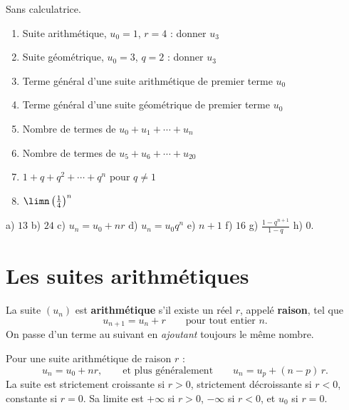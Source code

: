 \begin{automatismes}
Sans calculatrice.

\begin{enumerate}[label=\textbf{\alph*)}, leftmargin=*, itemsep=0.25em]
  \item Suite arithmétique, $u_{0} = 1$, $r = 4$ : donner $u_{3}$
  \item Suite géométrique, $u_{0} = 3$, $q = 2$ : donner $u_{3}$
  \item Terme général d'une suite arithmétique de premier terme $u_{0}$
  \item Terme général d'une suite géométrique de premier terme $u_{0}$
  \item Nombre de termes de $u_{0}+u_{1}+\cdots+u_{n}$
  \item Nombre de termes de $u_{5}+u_{6}+\cdots+u_{20}$
  \item $1+q+q^{2}+\cdots+q^{n}$ pour $q \neq 1$
  \item $\limn \left(\frac{1}{4}\right)^{n}$
\end{enumerate}
\end{automatismes}

\begin{corrige}[automatismes]
a) $13$ \quad b) $24$ \quad c) $u_{n} = u_{0}+nr$ \quad
d) $u_{n} = u_{0}q^{n}$ \quad e) $n+1$ \quad f) $16$ \quad
g) $\frac{1-q^{n+1}}{1-q}$ \quad h) $0$.
\end{corrige}

\section{Les suites arithmétiques}

\begin{definition}
La suite $\left(u_{n}\right)$ est \textbf{arithmétique} s'il existe un réel
$r$, appelé \textbf{raison}, tel que
\[
  u_{n+1} = u_{n}+r \qquad \text{pour tout entier } n .
\]
On passe d'un terme au suivant en \emph{ajoutant} toujours le même nombre.
\end{definition}

\begin{propriete}
Pour une suite arithmétique de raison $r$ :
\[
  u_{n} = u_{0}+nr, \qquad\text{et plus généralement}\qquad
  u_{n} = u_{p}+(n-p)\,r .
\]
La suite est strictement croissante si $r>0$, strictement décroissante si
$r<0$, constante si $r = 0$. Sa limite est $+\infty$ si $r>0$, $-\infty$ si
$r<0$, et $u_{0}$ si $r = 0$.
\end{propriete}

